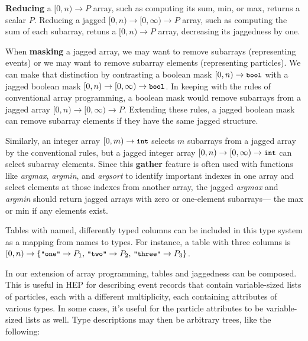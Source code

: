 \documentclass{webofc}
\begin{document}
{\bf Reducing} a $[0, n) \to P$ array, such as computing its sum, min, or max, returns a scalar $P$. Reducing a jagged $[0, n) \to [0, \infty) \to P$ array, such as computing the sum of each subarray, retuns a $[0, n) \to P$ array, decreasing its jaggedness by one.

When {\bf masking} a jagged array, we may want to remove subarrays (representing events) or we may want to remove subarray elements (representing particles). We can make that distinction by contrasting a boolean mask $[0, n) \to \mbox{\small\tt bool}$ with a jagged boolean mask $[0, n) \to [0, \infty) \to \mbox{\small\tt bool}$. In keeping with the rules of conventional array programming, a boolean mask would remove subarrays from a jagged array $[0, n) \to [0, \infty) \to P$. Extending these rules, a jagged boolean mask can remove subarray elements if they have the same jagged structure.

Similarly, an integer array $[0, m) \to \mbox{\small\tt int}$ selects $m$ subarrays from a jagged array by the conventional rules, but a jagged integer array $[0, n) \to [0, \infty) \to \mbox{\small\tt int}$ can select subarray elements. Since this {\bf gather} feature is often used with functions like {\it argmax}, {\it argmin}, and {\it argsort} to identify important indexes in one array and select elements at those indexes from another array, the jagged {\it argmax} and {\it argmin} should return jagged arrays with zero or one-element subarrays--- the max or min if any elements exist.

Tables with named, differently typed columns can be included in this type system as a mapping from names to types. For instance, a table with three columns is $[0, n) \to \{\mbox{\small\tt "one"} \to P_1\mbox{, }\mbox{\small\tt "two"} \to P_2\mbox{, }\mbox{\small\tt "three"} \to P_3\}$.


In our extension of array programming, tables and jaggedness can be composed. This is useful in HEP for describing event records that contain variable-sized lists of particles, each with a different multiplicity, each containing attributes of various types. In some cases, it's useful for the particle attributes to be variable-sized lists as well. Type descriptions may then be arbitrary trees, like the following:
\end{document}
